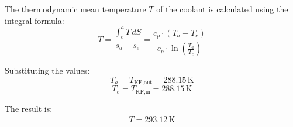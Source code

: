 The thermodynamic mean temperature \( \bar{T} \) of the coolant is calculated using the integral formula:  
\[
\bar{T} = \frac{\int_{e}^{a} T \, dS}{s_a - s_e} = \frac{c_p \cdot (T_a - T_e)}{c_p \cdot \ln \left( \frac{T_a}{T_e} \right)}
\]  

Substituting the values:  
\[
T_a = T_{\text{KF,out}} = 288.15 \, \text{K}
\]  
\[
T_e = T_{\text{KF,in}} = 288.15 \, \text{K}
\]  

The result is:  
\[
\bar{T} = 293.12 \, \text{K}
\]